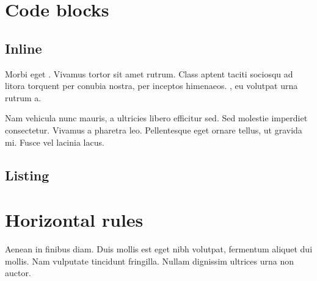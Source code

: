 \documentclass[letterpaper,10pt,english]{sphinxmanual}
\begin{document}
\section{Code blocks}
\label{\detokenize{specimen:code-blocks}}

\subsection{Inline}
\label{\detokenize{specimen:inline}}
Morbi eget . Vivamus  tortor
sit amet rutrum. Class aptent taciti sociosqu ad litora torquent per
conubia nostra, per inceptos himenaeos. {\hyperref[\detokenize{specimen:}]{\emph{}}},
eu volutpat urna rutrum a.

Nam vehicula nunc  mauris, a ultricies libero
efficitur sed. Sed molestie imperdiet consectetur. Vivamus a pharetra
leo. Pellentesque eget ornare tellus, ut gravida mi. Fusce vel lacinia
lacus.


\subsection{Listing}
\label{\detokenize{specimen:listing}}
%
\begin{sphinxVerbatim}[commandchars=\\\{\}]
    
           
       \PYG{p}{[}\PYG{p}{]}
         
      \PYG{p}{[}\PYG{p}{]}  \PYG{p}{[}\PYG{p}{]}
   
\end{sphinxVerbatim}
\sphinxresetverbatimhllines


\section{Horizontal rules}
\label{\detokenize{specimen:horizontal-rules}}
Aenean in finibus diam. Duis mollis est eget nibh volutpat, fermentum
aliquet dui mollis. Nam vulputate tincidunt fringilla. Nullam dignissim
ultrices urna non auctor.
\end{document}
